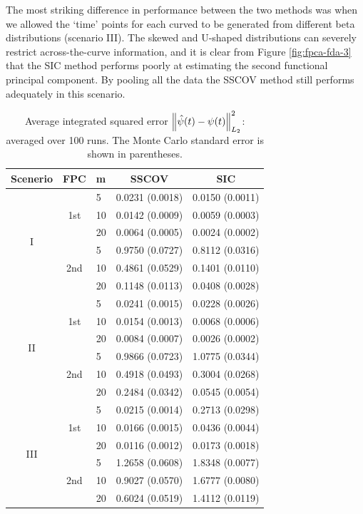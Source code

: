 The most striking difference in performance between the two methods was when we allowed the `time' points for each curved to be generated from different beta distributions (scenario III). The skewed and U-shaped distributions can severely restrict across-the-curve information, and it is clear from Figure \ref{fig:fpca-fda-3} that the SIC method performs poorly at estimating the second functional principal component. By pooling all the data the SSCOV method still performs adequately in this scenario. 
\begin{table}
	[ht] \caption{Average integrated squared error $\left\|\hat{\psi}(t) - \psi(t)\right\|^2_{L_2}$: averaged over 100 runs. The Monte Carlo standard error is shown in parentheses.} \centering 
	\begin{tabular}
		{|c|c|l|cc|} \hline Scenerio & FPC & m & SSCOV & SIC \\
		\hline \multirow{6}{*}{I}& \multirow{3}{*}{1st} & 5 & 0.0231 (0.0018) & 0.0150 (0.0011) \\
		& & 10 & 0.0142 (0.0009) & 0.0059 (0.0003) \\
		& & 20 & 0.0064 (0.0005) & 0.0024 (0.0002) \\
		\cline{2-5} & \multirow{3}{*}{2nd} & 5 & 0.9750 (0.0727) & 0.8112 (0.0316) \\
		& & 10 & 0.4861 (0.0529) & 0.1401 (0.0110) \\
		& & 20 & 0.1148 (0.0113) & 0.0408 (0.0028) \\
		\hline \multirow{6}{*}{II}& \multirow{3}{*}{1st} & 5 & 0.0241 (0.0015) & 0.0228 (0.0026) \\
		& & 10 & 0.0154 (0.0013) & 0.0068 (0.0006) \\
		& & 20 & 0.0084 (0.0007) & 0.0026 (0.0002) \\
		\cline{2-5} & \multirow{3}{*}{2nd} & 5 & 0.9866 (0.0723) & 1.0775 (0.0344) \\
		& & 10 & 0.4918 (0.0493) & 0.3004 (0.0268) \\
		& & 20 & 0.2484 (0.0342) & 0.0545 (0.0054) \\
		\hline \multirow{6}{*}{III} & \multirow{3}{*}{1st} & 5 & 0.0215 (0.0014) & 0.2713 (0.0298) \\
		& & 10 & 0.0166 (0.0015) & 0.0436 (0.0044) \\
		& & 20 & 0.0116 (0.0012) & 0.0173 (0.0018) \\
		\cline{2-5} & \multirow{3}{*}{2nd} & 5 & 1.2658 (0.0608) & 1.8348 (0.0077) \\
		& & 10 & 0.9027 (0.0570) & 1.6777 (0.0080) \\
		& & 20 & 0.6024 (0.0519) & 1.4112 (0.0119) \\
		\hline 
	\end{tabular}
	\label{tab:fpc-norm} 
\end{table}
